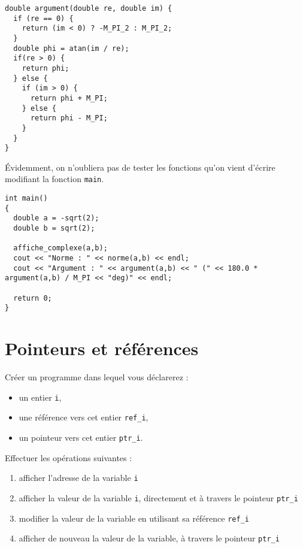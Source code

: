 \documentclass{book}
\newcommand{\inline}[1]{\texttt{#1}}
\begin{document}
\begin{correction}
\begin{verbatim}
double argument(double re, double im) {
  if (re == 0) {
    return (im < 0) ? -M_PI_2 : M_PI_2;
  }
  double phi = atan(im / re);
  if(re > 0) {
    return phi;
  } else {
    if (im > 0) {
      return phi + M_PI;
    } else {
      return phi - M_PI;
    }
  }
}
\end{verbatim}

Évidemment, on n'oubliera pas de tester les fonctions qu'on vient d'écrire modifiant la fonction \inline{main}.
\begin{verbatim}
int main()
{
  double a = -sqrt(2);
  double b = sqrt(2);

  affiche_complexe(a,b);
  cout << "Norme : " << norme(a,b) << endl;
  cout << "Argument : " << argument(a,b) << " (" << 180.0 * argument(a,b) / M_PI << "deg)" << endl;

  return 0;
}
\end{verbatim}
\end{correction}


\section{Pointeurs et références}

Créer un programme dans lequel vous déclarerez :

\begin{itemize}
\item un entier \texttt{i},
\item une référence vers cet entier \texttt{ref\_i},
\item un pointeur vers cet entier \texttt{ptr\_i}.
\end{itemize}

\vspace{1em}
Effectuer les opérations suivantes :

\begin{enumerate}
  \item afficher l'adresse de la variable \texttt{i}
  \item afficher la valeur de la variable \texttt{i}, directement et à travers le pointeur \texttt{ptr\_i}
  \item modifier la valeur de la variable en utilisant sa référence \texttt{ref\_i}
  \item afficher de nouveau la valeur de la variable, à travers le pointeur \texttt{ptr\_i}
\end{enumerate}
\end{document}
